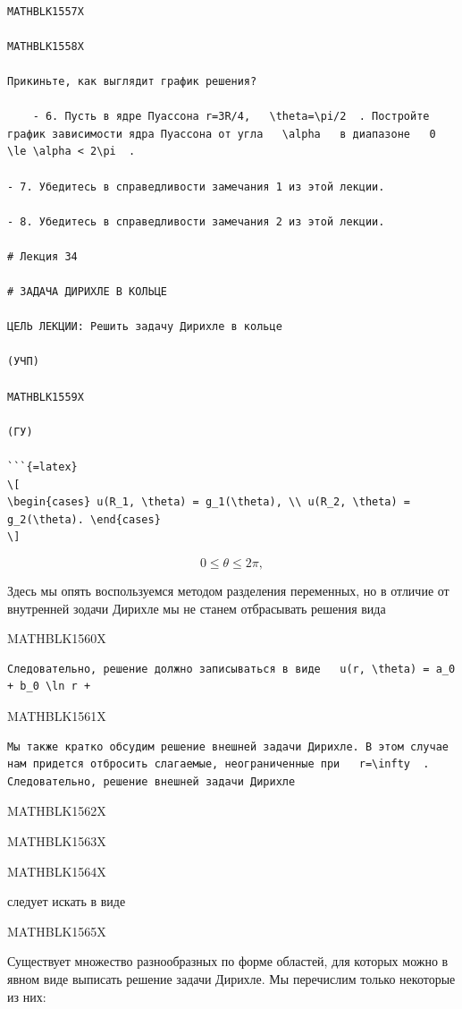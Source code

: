 \documentclass[
]{article}
\begin{document}
\begin{verbatim}

MATHBLK1557X

MATHBLK1558X

Прикиньте, как выглядит график решения?

    - 6. Пусть в ядре Пуассона r=3R/4,   \theta=\pi/2  . Постройте график зависимости ядра Пуассона от угла   \alpha   в диапазоне   0 \le \alpha < 2\pi  .

- 7. Убедитесь в справедливости замечания 1 из этой лекции.

- 8. Убедитесь в справедливости замечания 2 из этой лекции.

# Лекция 34

# ЗАДАЧА ДИРИХЛЕ В КОЛЬЦЕ

ЦЕЛЬ ЛЕКЦИИ: Решить задачу Дирихле в кольце

(УЧП)

MATHBLK1559X

(ГУ)

```{=latex}
\[
\begin{cases} u(R_1, \theta) = g_1(\theta), \\ u(R_2, \theta) = g_2(\theta). \end{cases}
\]
\end{verbatim}

\[
0 \le \theta \le 2\pi,
\]

Здесь мы опять воспользуемся методом разделения переменных, но в отличие
от внутренней зодачи Дирихле мы не станем отбрасывать решения вида

MATHBLK1560X

\begin{verbatim}
Следовательно, решение должно записываться в виде   u(r, \theta) = a_0 + b_0 \ln r + 
\end{verbatim}

MATHBLK1561X

\begin{verbatim}
Мы также кратко обсудим решение внешней задачи Дирихле. В этом случае нам придется отбросить слагаемые, неограниченные при   r=\infty  . Следовательно, решение внешней задачи Дирихле
\end{verbatim}

MATHBLK1562X

MATHBLK1563X

MATHBLK1564X

следует искать в виде

MATHBLK1565X

Существует множество разнообразных по форме областей, для которых можно
в явном виде выписать решение задачи Дирихле. Мы перечислим только
некоторые из них:
\end{document}
